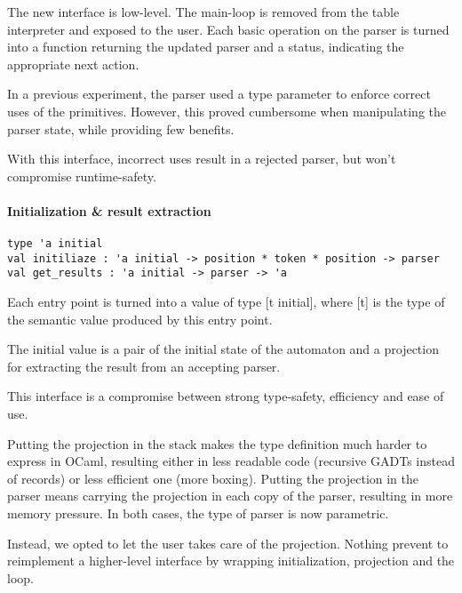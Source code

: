 \documentclass[twoside,a4paper]{article}
\begin{document}

The new interface is low-level.  The main-loop is removed from the table
interpreter and exposed to the user.  Each basic operation on the parser is
turned into a function returning the updated parser and a status, indicating
the appropriate next action.

In a previous experiment, the parser used a type parameter to enforce correct
uses of the primitives.  However, this proved cumbersome when manipulating the
parser state, while providing few benefits.

With this interface, incorrect uses result in a rejected parser, but won't
compromise runtime-safety. 


\paragraph{Initialization \& result extraction}

\begin{verbatim}
type 'a initial
val initiliaze : 'a initial -> position * token * position -> parser
val get_results : 'a initial -> parser -> 'a
\end{verbatim}

Each entry point is turned into a value of type [t initial], where [t] is the
type of the semantic value produced by this entry point. 

The initial value is a pair of the initial state of the automaton and a
projection for extracting the result from an accepting parser.

This interface is a compromise between strong type-safety, efficiency and ease
of use. 

Putting the projection in the stack makes the type definition much harder to
express in OCaml, resulting either in less readable code (recursive GADTs
instead of records) or less efficient one (more boxing). Putting the projection
in the parser means carrying the projection in each copy of the parser,
resulting in more memory pressure. In both cases, the type of parser is now
parametric.

Instead, we opted to let the user takes care of the projection. Nothing prevent
to reimplement a higher-level interface by wrapping initialization, projection
and the loop.
\end{document}
